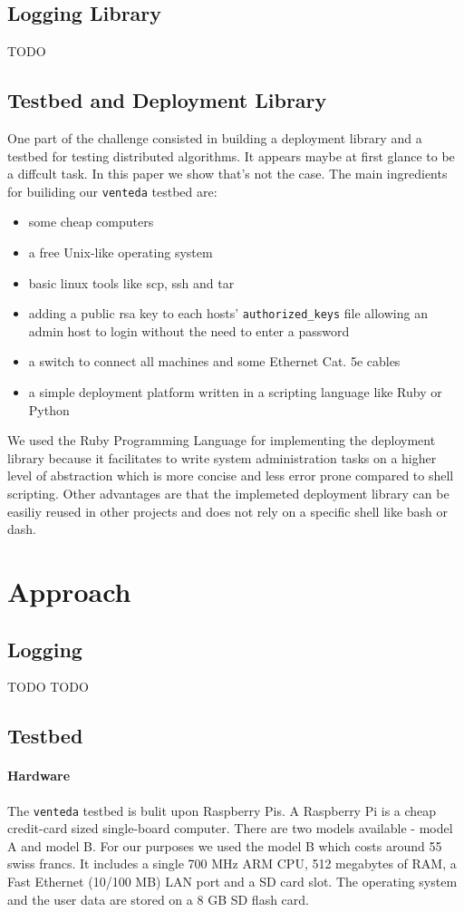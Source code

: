 \documentclass[10pt,a4paper]{article}
\begin{document}
\subsection{Logging Library}
TODO
\newpage

\subsection{Testbed and Deployment Library}
One part of the challenge consisted in building a deployment library and a testbed for testing distributed algorithms. It appears maybe at first glance to be a diffcult task. In this paper we show that's not the case. The main ingredients for builiding our \texttt{venteda} testbed are:
\begin{itemize}
\itemsep0em 
\item some cheap computers
\item a free Unix-like operating system
\item basic linux tools like scp, ssh and tar
\item adding a public rsa key to each hosts' \texttt{authorized\_keys} file allowing  an admin host to login without the need to enter a password
\item a switch to connect all machines and some Ethernet Cat. 5e cables 
\item a simple deployment platform written in a scripting language like Ruby or Python
\end{itemize}
We used the Ruby Programming Language for implementing the deployment library because it facilitates to write system administration tasks on a higher level of abstraction which is more concise and less error prone compared to shell scripting. Other advantages are that the implemeted deployment library can be easiliy reused in other projects and does not rely on a specific shell like bash or dash.

\section{Approach}
\subsection{Logging}
TODO
\newpage
TODO
\newpage
\subsection{Testbed}
\paragraph{Hardware}
The \texttt{venteda} testbed is bulit upon Raspberry Pis. A Raspberry Pi is a cheap credit-card sized single-board computer. There are two models available - model A and model B. For our purposes we used the model B which costs around 55 swiss francs. It includes a single 700 MHz ARM CPU, 512 megabytes of RAM, a Fast Ethernet (10/100 MB) LAN port and a SD card slot. The operating system and the user data are stored on a 8 GB SD flash card. 
\end{document}
